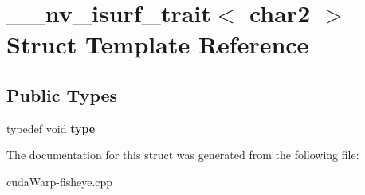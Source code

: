 \hypertarget{struct____nv__isurf__trait_3_01char2_01_4}{}\section{\+\_\+\+\_\+nv\+\_\+isurf\+\_\+trait$<$ char2 $>$ Struct Template Reference}
\label{struct____nv__isurf__trait_3_01char2_01_4}
\subsection*{Public Types}
\begin{DoxyCompactItemize}
\item 
typedef void {\bfseries type}\hypertarget{struct____nv__isurf__trait_3_01char2_01_4_aa3368a8c3a8a1e7c3def3a47d1c97ec8}{}\label{struct____nv__isurf__trait_3_01char2_01_4_aa3368a8c3a8a1e7c3def3a47d1c97ec8}

\end{DoxyCompactItemize}


The documentation for this struct was generated from the following file\+:\begin{DoxyCompactItemize}
\item 
cuda\+Warp-\/fisheye.\+cpp\end{DoxyCompactItemize}
